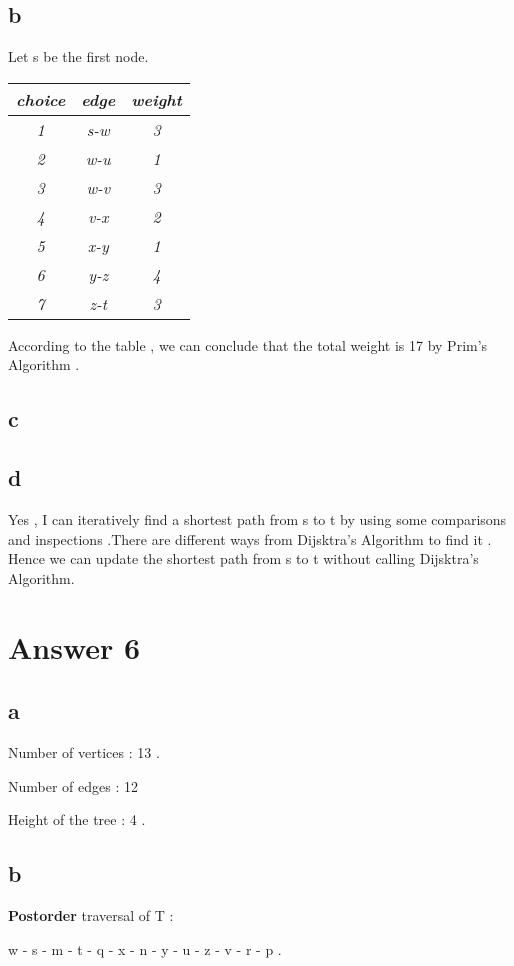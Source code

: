 \documentclass[11pt]{article}
\begin{document}
\subsection*{b}
\hspace{15px} Let s be the first node. \par 
\bigskip
	\begin{tabular}{|c|c|c|} \hline
	\textit{choice} & \textit{edge} & \textit{weight} \\ \hline
	\textit{1} & \textit{s-w} & \textit{3} \\
	\textit{2} & \textit{w-u} & \textit{1} \\
	\textit{3} & \textit{w-v} & \textit{3} \\
	\textit{4} & \textit{v-x} &\textit{2} \\
	\textit{5} & \textit{x-y}&\textit{1} \\
	\textit{6} & \textit{y-z}& \textit{4}\\
	\textit{7} & \textit{z-t} & \textit{3} \\ \hline
	\end{tabular} 
	\bigskip
	\par 
	According to the table , we can conclude that the total weight is 17 by Prim's Algorithm .
\subsection*{c}
\subsection*{d}
\hspace{15px} Yes , I can iteratively find a shortest path from s to t by using some comparisons and inspections .There are different ways from Dijsktra's Algorithm to find it . Hence we can update the shortest path from s to t without calling Dijsktra's Algorithm.
\section*{Answer 6}
\subsection*{a}
\hspace{12px} Number of vertices : 13 . \par 
Number of edges : 12 \par 
Height of the tree : 4 .
\subsection*{b}
\hspace{12px} \textbf{Postorder} traversal of T : \par w - s - m - t - q - x - n - y - u - z - v - r - p .
\end{document}
